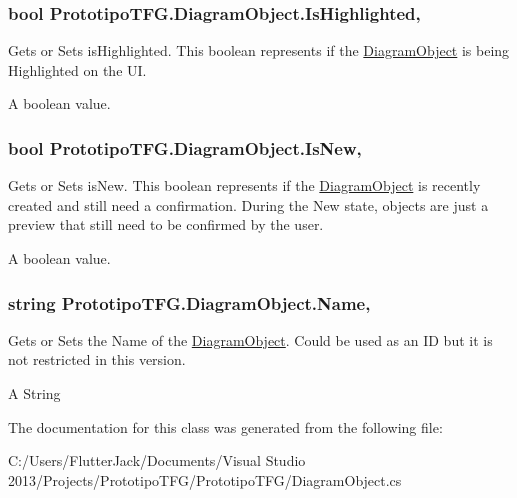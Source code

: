 \subsubsection[{Is\+Highlighted}]{\setlength{\rightskip}{0pt plus 5cm}bool Prototipo\+T\+F\+G.\+Diagram\+Object.\+Is\+Highlighted\hspace{0.3cm}{\ttfamily [get]}, {\ttfamily [set]}}\label{class_prototipo_t_f_g_1_1_diagram_object_ae5123201b41c4595b46049a92ea3d962}


Gets or Sets is\+Highlighted. This boolean represents if the \hyperlink{class_prototipo_t_f_g_1_1_diagram_object}{Diagram\+Object} is being Highlighted on the U\+I. 

A boolean value.\hypertarget{class_prototipo_t_f_g_1_1_diagram_object_a9f0c482af0abba2fc1f763fdae8fa23f}{}
\subsubsection[{Is\+New}]{\setlength{\rightskip}{0pt plus 5cm}bool Prototipo\+T\+F\+G.\+Diagram\+Object.\+Is\+New\hspace{0.3cm}{\ttfamily [get]}, {\ttfamily [set]}}\label{class_prototipo_t_f_g_1_1_diagram_object_a9f0c482af0abba2fc1f763fdae8fa23f}


Gets or Sets is\+New. This boolean represents if the \hyperlink{class_prototipo_t_f_g_1_1_diagram_object}{Diagram\+Object} is recently created and still need a confirmation. During the New state, objects are just a preview that still need to be confirmed by the user. 

A boolean value.\hypertarget{class_prototipo_t_f_g_1_1_diagram_object_a3c812a834f7026cc36116d1c35106060}{}
\subsubsection[{Name}]{\setlength{\rightskip}{0pt plus 5cm}string Prototipo\+T\+F\+G.\+Diagram\+Object.\+Name\hspace{0.3cm}{\ttfamily [get]}, {\ttfamily [set]}}\label{class_prototipo_t_f_g_1_1_diagram_object_a3c812a834f7026cc36116d1c35106060}


Gets or Sets the Name of the \hyperlink{class_prototipo_t_f_g_1_1_diagram_object}{Diagram\+Object}. Could be used as an I\+D but it is not restricted in this version. 

A String

The documentation for this class was generated from the following file\+:\begin{DoxyCompactItemize}
\item 
C\+:/\+Users/\+Flutter\+Jack/\+Documents/\+Visual Studio 2013/\+Projects/\+Prototipo\+T\+F\+G/\+Prototipo\+T\+F\+G/Diagram\+Object.\+cs\end{DoxyCompactItemize}
